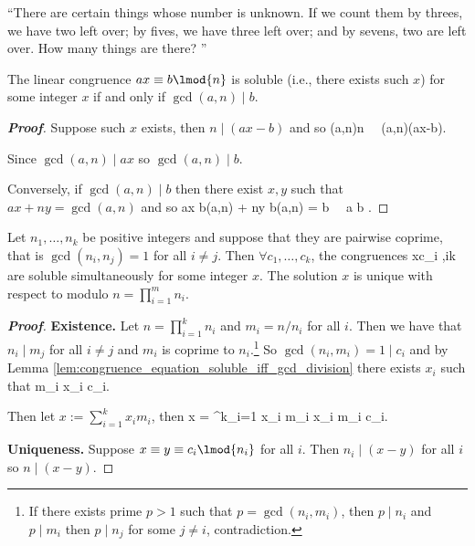 ``There are certain things whose number is unknown. If we count them by threes, we have two left over; by fives, we have three left over; and by sevens, two are left over. How many things are there? ''

\begin{lemma}\label{lem:congruence_equation_soluble_iff_gcd_division}
The linear congruence $ax\equiv b\lmod{n}$ is soluble (i.e., there exists such $x$) for some integer $x$ if and only if $\gcd(a,n)\mid b$.
\end{lemma}

\begin{proof}[\bf Proof]
Suppose such $x$ exists, then $n\mid (ax-b)$ and so
\be
\gcd(a,n)\mid n \ \ra\ \gcd(a,n)\mid (ax-b).
\ee

Since $\gcd(a,n)\mid ax$ so $\gcd(a,n)\mid b$.

Conversely, if $\gcd(a,n)\mid b$ then there exist $x,y$ such that $ax + ny = \gcd(a,n)$ and so
\be
ax \frac b{\gcd(a,n)} + ny \frac b{\gcd(a,n)} = b \ \ra\ a \equiv b .
\ee
\end{proof}

\begin{theorem}\label{thm:chinese_remainder_number_theory}
Let $n_1,\dots,n_k$ be positive integers and suppose that they are pairwise coprime, that is $\gcd(n_i,n_j)=1$ for all $i\neq j$. Then $\forall c_1,\dots,c_k$, the congruences
\be
x\equiv c_i ,\leq i\leq k
\ee
are soluble simultaneously for some integer $x$. The solution $x$ is unique with respect to modulo $n = \prod^m_{i=1} n_i$.
\end{theorem}

\begin{proof}[\bf Proof]
{\bf Existence.} Let $n = \prod^k_{i=1} n_i$ and $m_i = n/n_i$ for all $i$. Then we have that $n_i\mid m_j$ for all $i\neq j$ and $m_i$ is coprime to $n_i$.\footnote{If there exists prime $p>1$ such that $p = \gcd(n_i,m_i)$, then $p\mid n_i$ and $p\mid m_i$ then $p\mid n_j$ for some $j\neq i$, contradiction.} So $\gcd(n_i,m_i) = 1 \mid c_i$ and by Lemma \ref{lem:congruence_equation_soluble_iff_gcd_division} there exists $x_i$ such that
\be
m_i x_i \equiv c_i.
\ee

Then let $x := \sum^k_{i=1} x_im_i$, then
\be
x = \sum^k_{i=1} x_i m_i \equiv x_i m_i \equiv c_i.
\ee

{\bf Uniqueness.} Suppose $x\equiv y \equiv c_i\lmod{n_i}$ for all $i$. Then $n_i\mid (x-y)$ for all $i$ so $n\mid (x-y)$.
\end{proof}

